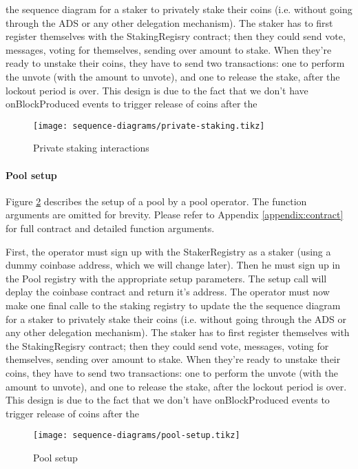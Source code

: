 the sequence diagram for a staker to privately stake their coins (i.e. without going through the ADS or any other delegation mechanism).  The staker has to first register themselves with the StakingRegisry contract; then they could send vote, messages, voting for themselves, sending over amount to stake. When they're ready to unstake their coins, they have to send two transactions: one to perform the unvote (with the amount to unvote), and one to release the stake, after the lockout period is over. This design is due to the fact that we don't have onBlockProduced events to trigger release of coins after the 

\begin{figure}[ht]
\centering
\texttt{[image: sequence-diagrams/private-staking.tikz]}
\caption{Private staking interactions}
\label{fig:priv_staking}
\end{figure}

\paragraph{Pool setup}
Figure \ref{fig:pool_setup} describes the setup of a pool by a pool operator. The function arguments are omitted for brevity. Please refer to Appendix \ref{appendix:contract} for full contract and detailed function arguments. 

First, the operator must sign up with the StakerRegistry as a staker (using a dummy coinbase address, which we will change later). Then he must sign up in the Pool registry with  the appropriate setup parameters. The setup call will deplay the coinbase contract and return it's address. The operator must now make one final calle to the staking registry to update the  
the sequence diagram for a staker to privately stake their coins (i.e. without going through the ADS or any other delegation mechanism).  The staker has to first register themselves with the StakingRegisry contract; then they could send vote, messages, voting for themselves, sending over amount to stake. When they're ready to unstake their coins, they have to send two transactions: one to perform the unvote (with the amount to unvote), and one to release the stake, after the lockout period is over. This design is due to the fact that we don't have onBlockProduced events to trigger release of coins after the 

\begin{figure}[ht]
\centering
\texttt{[image: sequence-diagrams/pool-setup.tikz]}
\caption{Pool setup}
\label{fig:pool_setup}
\end{figure}

